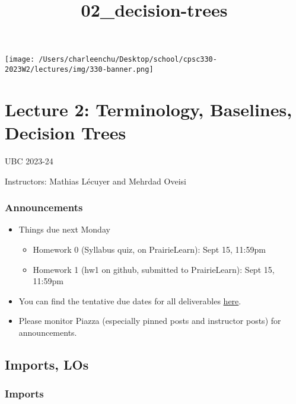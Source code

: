 \documentclass[11pt]{article}
\title{02\_decision-trees}
\providecommand{\tightlist}{%
      \setlength{\itemsep}{0pt}\setlength{\parskip}{0pt}}
\begin{document}
    
    \maketitle
    
    

    
    \texttt{[image: /Users/charleenchu/Desktop/school/cpsc330-2023W2/lectures/img/330-banner.png]}

    \section{Lecture 2: Terminology, Baselines, Decision
Trees}\label{lecture-2-terminology-baselines-decision-trees}

UBC 2023-24

Instructors: Mathias Lécuyer and Mehrdad Oveisi

    \subsubsection{Announcements}\label{announcements}

\begin{itemize}
\tightlist
\item
  Things due next Monday

  \begin{itemize}
  \tightlist
  \item
    Homework 0 (Syllabus quiz, on PrairieLearn): Sept 15, 11:59pm
  \item
    Homework 1 (hw1 on github, submitted to PrairieLearn): Sept 15,
    11:59pm
  \end{itemize}
\item
  You can find the tentative due dates for all deliverables
  \href{https://github.com/UBC-CS/cpsc330-2023W2/tree/main\#deliverable-due-dates-tentative}{here}.
\item
  Please monitor Piazza (especially pinned posts and instructor posts)
  for announcements.
\end{itemize}

    \subsection{Imports, LOs}\label{imports-los}

    \subsubsection{Imports}\label{imports}
\end{document}
